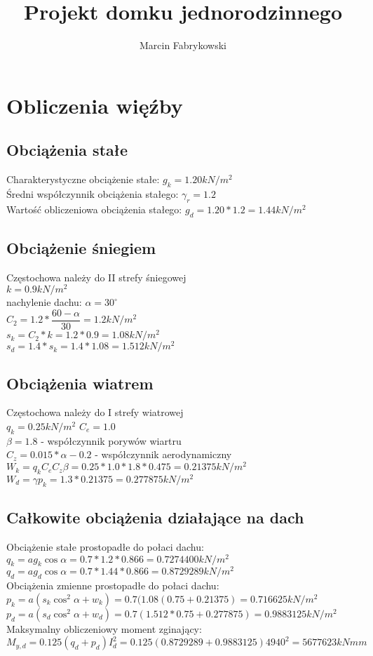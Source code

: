 \documentclass[12pt,a4paper]{article}
\author{Marcin Fabrykowski}
\title{Projekt domku jednorodzinnego}
\begin{document}
\section{Obliczenia więźby}
\subsection{Obciążenia stałe}
Charakterystyczne obciążenie stałe: $g_k=1.20kN/m^2$\\
Średni współczynnik obciążenia stałego: $\gamma_r=1.2$\\
Wartość obliczeniowa obciążenia stałego: $g_d = 1.20 * 1.2 = 1.44 kN/m^2$
\subsection{Obciążenie śniegiem}
Częstochowa należy do II strefy śniegowej\\
$k = 0.9kN/m^2$\\
nachylenie dachu: $\alpha = 30^\circ$\\
$C_2 = 1.2 * \dfrac{60 - \alpha}{30} = 1.2kN/m^2$\\
$s_k = C_2 * k = 1.2 * 0.9 = 1.08kN/m^2$\\
$s_d = 1.4 * s_k = 1.4 * 1.08 = 1.512kN/m^2$
\subsection{Obciążenia wiatrem}
Częstochowa należy do I strefy wiatrowej\\
$q_k = 0.25 kN/m^2$
$C_e = 1.0$\\
$\beta = 1.8$ - współczynnik porywów wiartru\\
$C_z = 0.015 * \alpha -0.2$ - współczynnik aerodynamiczny\\
$W_k = q_kC_eC_z\beta = 0.25 * 1.0 * 1.8 * 0.475 = 0.21375kN/m^2$\\
$W_d = \gamma p_k = 1.3 * 0.21375 = 0.277875 kN/m^2$
\subsection{Całkowite obciążenia działające na dach}
Obciążenie stałe prostopadłe do połaci dachu:\\
$q_k = ag_k\cos \alpha = 0.7 * 1.2 * 0.866 = 0.7274400 kN/m^2$\\
$q_d = ag_d\cos \alpha = 0.7 * 1.44 * 0.866 = 0.8729289 kN/m^2$\\
Obciążenia zmienne prostopadłe do połaci dachu:\\
$p_k = a(s_k\cos^2\alpha + w_k) = 0.7(1.08(0.75+0.21375) = 0.716625kN/m^2$\\
$p_d = a(s_d\cos^2\alpha + w_d) = 0.7(1.512*0.75+0.277875) = 0.9883125 kN/m^2$\\
Maksymalny obliczeniowy moment zginający:\\
$M_{y,d}=0.125(q_d+p_d)I_d^2= 0.125(0.8729289 + 0.9883125) 4940^2 = 5677623 kNmm$
\end{document}
